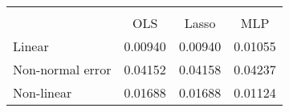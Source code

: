 \begin{tabular}{lccc}
\hline\hline \\ [-1.8ex]
 & OLS & Lasso & MLP \\ 
 \hline 
Linear & 0.00940 & 0.00940 & 0.01055 \\ 
Non-normal error & 0.04152 & 0.04158 & 0.04237 \\ 
Non-linear & 0.01688 & 0.01688 & 0.01124 \\ 
\hline\hline
\end{tabular}